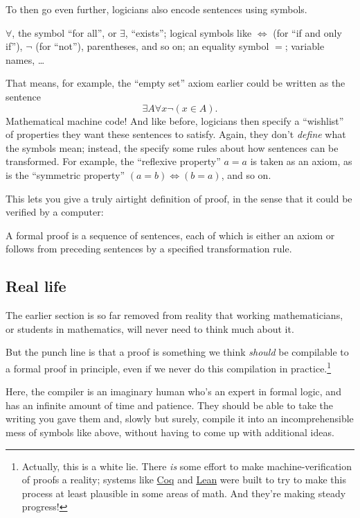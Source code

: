 \documentclass[11pt]{scrartcl}
\begin{document}
To then go even further, logicians also encode sentences using symbols.
\begin{itemize}
  \ii $\forall$, the symbol ``for all'', or $\exists$, ``exists'';
  \ii logical symbols like $\iff$ (for ``if and only if''),
  $\neg$ (for ``not''), parentheses, and so on;
  \ii an equality symbol $=$;
  \ii variable names,
  \ii \dots
\end{itemize}
That means, for example, the ``empty set'' axiom earlier could be written as
the sentence
\[ \exists A \forall x \neg (x \in A). \]
Mathematical machine code!
And like before, logicians then specify a ``wishlist'' of properties
they want these sentences to satisfy.
Again, they don't \emph{define} what the symbols mean;
instead, the specify some rules about how sentences can be transformed.
For example, the ``reflexive property'' $a=a$ is taken as an axiom,
as is the ``symmetric property'' $(a=b) \iff (b=a)$, and so on.

This lets you give a truly airtight definition of proof,
in the sense that it could be verified by a computer:
\begin{definition}
  A \alert{formal proof} is a sequence of sentences,
  each of which is either an axiom
  or follows from preceding sentences by a specified transformation rule.
\end{definition}

\subsection{Real life}
The earlier section is so far removed from reality
that working mathematicians, or students in mathematics,
will never need to think much about it.

But the punch line is that a proof is something we think
\emph{should} be compilable to a formal proof in principle,
even if we never do this compilation in practice.\footnote{Actually,
  this is a white lie.
  There \emph{is} some effort to make machine-verification of proofs a reality;
  systems like \href{https://en.wikipedia.org/wiki/Coq}{Coq}
  and \href{https://en.wikipedia.org/wiki/Lean_(proof_assistant)}{Lean}
  were built to try to make this process at least plausible in some areas of math.
  And they're making steady progress!}

Here, the compiler is an imaginary human who's an expert in formal logic,
and has an infinite amount of time and patience.
They should be able to take the writing you gave them and, slowly but surely,
compile it into an incomprehensible mess of symbols like above,
without having to come up with additional ideas.
\end{document}
